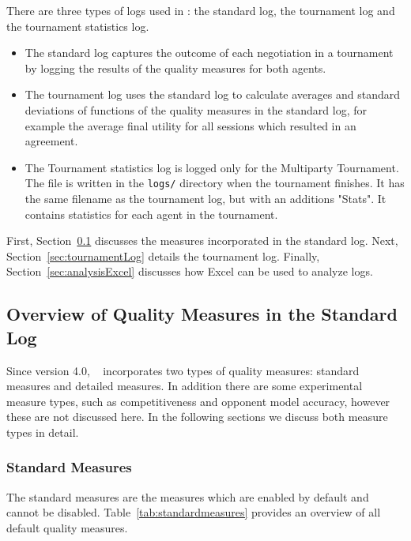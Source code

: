 \documentclass[]{article}
\begin{document}
There are  three types of logs used in \Genius: the standard log, the tournament log and the tournament statistics log.
\begin{itemize}
\item The standard log captures the outcome of each negotiation in a tournament by logging the results of the quality measures for both agents.
\item The tournament log uses the standard log to calculate averages and standard deviations of functions of the quality measures in the standard log, for example the average final utility for all sessions which resulted in an agreement.
\item The Tournament statistics log is logged only for the Multiparty Tournament. The file is written in the \verb|logs/| directory when the tournament finishes. It has the same filename as the tournament log, but with an additions "Stats". It contains statistics for each agent in the tournament.
\end{itemize}

First, Section~\ref{sec:standardLog} discusses the measures incorporated in the standard log. Next, Section~\ref{sec:tournamentLog} details the tournament log. Finally, Section~\ref{sec:analysisExcel} discusses how Excel can be used to analyze logs.

\subsection{Overview of Quality Measures in the Standard Log}\label{sec:standardLog}
Since version 4.0, \Genius~ incorporates two types of quality measures: standard measures and detailed measures. In addition there are some experimental measure types, such as competitiveness and opponent model accuracy, however these are not discussed here. In the following sections we discuss both measure types in detail.

\subsubsection{Standard Measures}
The standard measures are the measures which are enabled by default and cannot be disabled. Table~\ref{tab:standardmeasures} provides an overview of all default quality measures.
\end{document}
